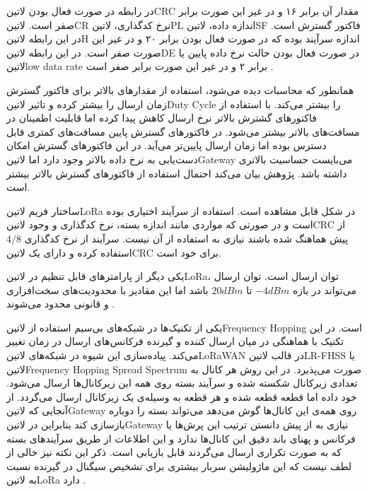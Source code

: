 در رابطه  در صورت فعال بودن ‌لاتین{CRC} مقدار آن برابر ۱۶ و در غیر این صورت برابر صفر است.
‌لاتین{CR} نرخ کدگذاری،
‌لاتین{PL} اندازه داده،
‌لاتین{SF} فاکتور گسترش است.
در این رابطه ‌لاتین{H} اندازه سرآیند بوده که در صورت فعال بودن برابر ۲۰ و در غیر این صورت صفر است.
در این رابطه ‌لاتین{DE} در صورت فعال بودن حالت نرخ داده پایین یا ‌لاتین{low data rate} برابر ۲ و در غیر این صورت برابر صفر است
.

همانطور که محاسبات دیده می‌شود، استفاده از مقدارهای بالاتر برای فاکتور گسترش زمان ارسال را بیشتر کرده و تاثیر ‌لاتین{Duty Cycle} را بیشتر می‌کند.
با استفاده از فاکتورهای گشترش بالاتر نرخ ارسال کاهش پیدا کرده اما قابلیت اطمینان در مسافت‌های بالاتر بیشتر می‌شود.
در فاکتورهای گسترش پایین مسافت‌های کمتری قابل دسترس بوده اما زمان ارسال پایین‌تر می‌آید. در این فاکتورهای گسترش
امکان دست‌یابی به نرخ داده بالاتر وجود دارد اما ‌لاتین{Gateway} می‌بایست حساسیت بالاتری داشته باشد.
پژوهش  بیان می‌کند احتمال استفاده از فاکتورهای گسترش بالاتر بیشتر است.

ساختار فریم ‌لاتین{LoRa} در شکل  قابل مشاهده است. استفاده از سرآیند اختیاری بوده است و در صورتی که مواردی مانند اندازه بسته،
نرخ کدگذاری و وجود ‌لاتین{CRC} از پیش هماهنگ شده باشند نیازی به استفاده از آن نیست. سرآیند از نرخ کدگذاری $4/8$ استفاده کرده و دارای یک ‌لاتین{CRC}
برای خود است.

یکی دیگر از پارامترهای قابل تنظیم در ‌لاتین{LoRa}، توان ارسال است. توان ارسال می‌تواند در بازه $-4dBm$ تا $20dBm$
باشد اما این مقادیر با محدودیت‌های سخت‌افزاری و قانونی محدود می‌شوند
.


یکی از تکنیک‌ها در شبکه‌های بی‌سیم استفاده از ‌لاتین{Frequency Hopping} است. در این تکنیک با هماهنگی در میان ارسال کننده و گیرنده فرکانس‌های ارسال در زمان
تغییر می‌کند. پیاده‌سازی این شیوه در شبکه‌های ‌لاتین{LoRaWAN} در قالب ‌لاتین{LR-FHSS} یا
‌لاتین{Frequency Hopping Spread Spectrum}
صورت می‌پذیرد. در این روش هر کانال به تعدادی زیرکانال شکسته شده و سرآیند بسته روی همه این زیرکانال‌ها ارسال می‌شود.
خود داده اما قطعه قطعه شده و هر قطعه به وسیله‌ی یک زیرکانال ارسال می‌گردد.
از آنجایی که ‌لاتین{Gateway} روی همه‌ی این کانال‌ها گوش می‌دهد می‌تواند بسته را دوباره بازسازی کند بنابراین
در ‌لاتین{Gateway} نیازی به از پیش دانستن ترتیب این پرش‌ها یا فرکانس و پهنای باند دقیق این کانال‌ها ندارد
و این اطلاعات از طریق سرآیندهای بسته که به صورت تکراری ارسال می‌گردند قابل بازیابی است.
ذکر این نکته نیز خالی از لطف نیست که این ماژولیشن سربار بیشتری برای تشخیص سیگنال در گیرنده نسبت به ‌لاتین{LoRa} دارد
.

